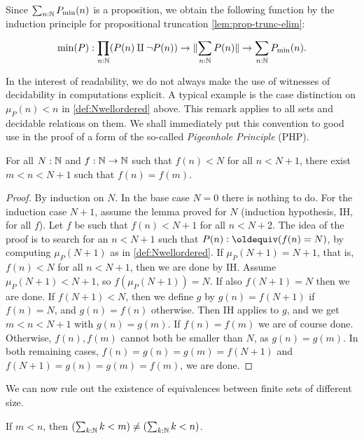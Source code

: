\begin{definition}
Since $\sum_{n:\mathbb{N}} P_{\min}(n)$ is a proposition, 
we obtain the following function by the induction
principle for propositional truncation \cref{lem:prop-trunc-elim}:

\begin{align}\label{eqn:min}%
\min(P) : \prod_{n:\NN}(P(n)\amalg\neg P(n)) \to 
           \Trunc{\sum_{n:\NN} P(n)} \to  \sum_{n:\NN} P_{\min}(n).
\end{align}
\end{definition}

\begin{remark}\label{rem:computations-can-decide}
In the interest of readability, we do not always make the use
of witnesses of decidability in computations explicit.
A typical example is the case distinction on $\mu_P(n) < n$ in
\cref{def:Nwellordered} above. This remark applies to all
sets and decidable relations on them. We shall immediately put
this convention to good use in the proof of a form of the so-called
\emph{Pigeonhole Principle} (PHP).
\end{remark}

\begin{lemma}\label{lem:PHP}
For all $N:\mathbb{N}$ and $f:\mathbb{N}\to\mathbb{N}$ such that $f(n)<N$
for all $n<N+1$, there exist $m < n < N+1$ such that $f(n)=f(m)$.
\end{lemma}
\begin{proof}
By induction on $N$. In the base case $N=0$ there is nothing to do.
For the induction case $N+1$, assume the lemma proved for $N$
(induction hypothesis, IH, for all $f$). Let $f$ be such 
that $f(n)<N+1$ for all $n<N+2$. The idea of the proof is
to search for an $n<N+1$ such that $P(n)\defeq (f(n)=N)$,
by computing $\mu_P(N+1)$ as in \cref{def:Nwellordered}.
If $\mu_P(N+1)=N+1$, that is, $f(n)<N$ for all $n<N+1$,
then we are done by IH. Assume $\mu_P(N+1) < N+1$,
so $f(\mu_P(N+1))=N$.
If also $f(N+1)=N$ then we are done.
If $f(N+1)<N$, then we define $g$ by $g(n)=f(N+1)$
if $f(n)= N$, and $g(n)=f(n)$ otherwise. 
Then IH applies to $g$, and we get $m < n < N+1$ with 
$g(n)=g(m)$. If $f(n)=f(m)$ we are of course done. 
Otherwise, $f(n),f(m)$ cannot both be smaller than $N$, 
as $g(n)=g(m)$. In both remaining cases, 
$f(n)=g(n)=g(m)=f(N+1)$ and $f(N+1)=g(n)=g(m)=f(m)$,
we are done.
\end{proof}

We can now rule out the existence of equivalences between finite
sets of different size.
\begin{corollary}\label{cor:Fin-n-injective}
If $m<n$, then $(\sum_{k:\mathbb{N}} k<m) \neq (\sum_{k:\mathbb{N}} k<n)$.
\end{corollary}

